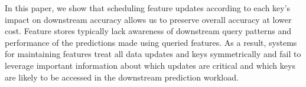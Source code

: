 
In this paper, we show that scheduling feature updates according to each key's impact on downstream accuracy allows us to preserve overall accuracy at lower cost. Feature stores %
typically lack awareness of downstream query patterns and performance of the predictions made using queried features. As a result, systems for maintaining features treat all data updates and keys symmetrically and fail to leverage important information about which updates are critical and which keys are likely to be accessed in the downstream prediction workload. 









